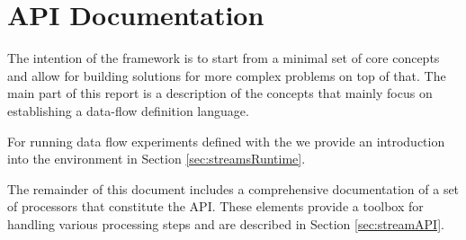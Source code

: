 \clearpage
\part{API Documentation}

The intention of the \streams framework is to start from a minimal set
of core concepts and allow for building solutions for more complex
problems on top of that. The main part of this report is a description
of the concepts that mainly focus on establishing a data-flow
definition language.

For running data flow experiments defined with the \streams we provide
an introduction into the  environment in Section
\ref{sec:streamsRuntime}.

\bigskip

The remainder of this document includes a comprehensive documentation
of a set of processors that constitute the \streams API. These
elements provide a toolbox for handling various processing steps and
are described in Section \ref{sec:streamAPI}.


\begin{appendix}

%

%
%

\end{appendix}
